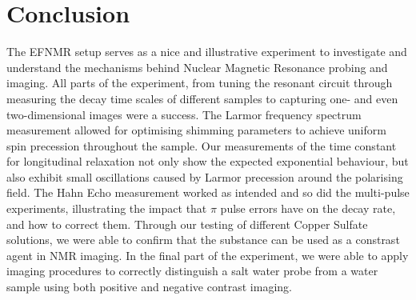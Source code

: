 \documentclass[
    parskip=half, 
    twoside=false,
    twocolumn=true,
    fontsize=11pt,
]{scrarticle}
\begin{document}
\section{Conclusion}
The EFNMR setup serves as a nice and illustrative experiment to investigate and understand the mechanisms behind Nuclear Magnetic Resonance probing and imaging. All parts of the experiment, from tuning the resonant circuit through measuring the decay time scales of different samples to capturing one- and even two-dimensional images were a success. The Larmor frequency spectrum measurement allowed for optimising shimming parameters to achieve uniform spin precession throughout the sample. Our measurements of the time constant for longitudinal relaxation not only show the expected exponential behaviour, but also exhibit small oscillations caused by Larmor precession around the polarising field. The Hahn Echo measurement worked as intended and so did the multi-pulse experiments, illustrating the impact that $\pi$ pulse errors have on the decay rate, and how to correct them. Through our testing of different Copper Sulfate solutions, we were able to confirm that the substance can be used as a constrast agent in NMR imaging. In the final part of the experiment, we were able to apply imaging procedures to correctly distinguish a salt water probe from a water sample using both positive and negative contrast imaging.

\nocite{*}
\printbibliography
\end{document}
